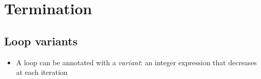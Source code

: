\documentclass[a4paper,11pt,twoside,openright]{report}
\begin{document}




  
\section{Termination}

\subsection{Loop variants}

  \begin{itemize}
  \item A loop can be annotated with a \emph{variant}: an integer
    expression that decreases at each iteration
  \end{itemize}
\end{document}
